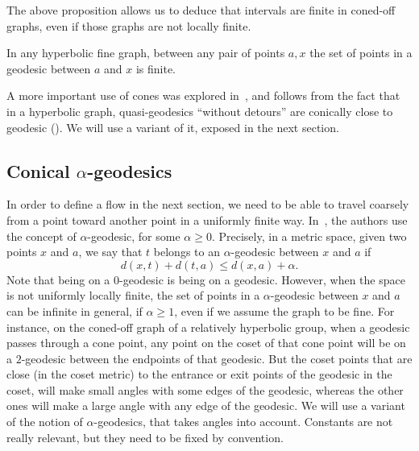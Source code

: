 The above proposition allows us to deduce that intervals are finite in coned-off graphs, even if those graphs are not locally finite.

\begin{prop}\label{prop;geod_finite}
In any hyperbolic fine graph, between any pair of points $a,x$ the set of points in a geodesic between $a$ and $x$ is finite.
\end{prop}

A more important use of cones was explored in~\cite{Israel}, and follows from the fact that in a hyperbolic graph, quasi-geodesics ``without detours'' are conically close to geodesic (\cite[Prop.~1.11]{Israel}). We will use a variant of it, exposed in the next section.

\subsection{Conical \texorpdfstring{$\alpha$}{alpha}-geodesics}

In order to define a flow in the next section, we need to be able to travel coarsely from a point toward another point in a uniformly finite way. In~\cite{AL}, the authors use the concept of $\alpha$-geodesic, for some $\alpha\geq 0$. Precisely, in a metric space, given two points $x$ and $a$, we say that $t$ belongs to an $\alpha$-geodesic between $x$ and $a$ if
\[
d(x,t)+d(t,a)\leq d(x,a)+\alpha.
\]
Note that being on a $0$-geodesic is being on a geodesic. However, when the space is not uniformly locally finite, the set of points in a $\alpha$-geodesic between $x$ and $a$ can be infinite in general, if $\alpha \geq 1$, even if we assume the graph to be fine. For instance, on the coned-off graph of a relatively hyperbolic group, when a geodesic passes through a cone point, any point on the coset of that cone point will be on a $2$-geodesic between the endpoints of that geodesic. But the coset points that are close (in the coset metric) to the entrance or exit points of the geodesic in the coset, will make small angles with some edges of the geodesic, whereas the other ones will make a large angle with any edge of the geodesic. We will use a variant of the notion of $\alpha$-geodesics, that takes angles into account. Constants are not really relevant, but they need to be fixed by convention.

